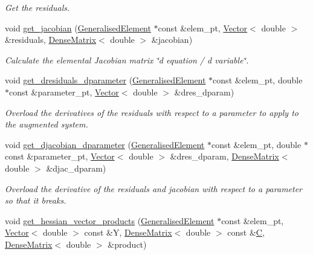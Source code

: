 \begin{DoxyCompactItemize}
\begin{DoxyCompactList}\small\item\em Get the residuals. \end{DoxyCompactList}\item 
void \hyperlink{classoomph_1_1HopfHandler_ab36c50421f53accced01dd9e04d904ef}{get\+\_\+jacobian} (\hyperlink{classoomph_1_1GeneralisedElement}{Generalised\+Element} $\ast$const \&elem\+\_\+pt, \hyperlink{classoomph_1_1Vector}{Vector}$<$ double $>$ \&residuals, \hyperlink{classoomph_1_1DenseMatrix}{Dense\+Matrix}$<$ double $>$ \&jacobian)
\begin{DoxyCompactList}\small\item\em Calculate the elemental Jacobian matrix \char`\"{}d equation 
/ d variable\char`\"{}. \end{DoxyCompactList}\item 
void \hyperlink{classoomph_1_1HopfHandler_a2953368ecc48dc22f8ea1f563064ece2}{get\+\_\+dresiduals\+\_\+dparameter} (\hyperlink{classoomph_1_1GeneralisedElement}{Generalised\+Element} $\ast$const \&elem\+\_\+pt, double $\ast$const \&parameter\+\_\+pt, \hyperlink{classoomph_1_1Vector}{Vector}$<$ double $>$ \&dres\+\_\+dparam)
\begin{DoxyCompactList}\small\item\em Overload the derivatives of the residuals with respect to a parameter to apply to the augmented system. \end{DoxyCompactList}\item 
void \hyperlink{classoomph_1_1HopfHandler_a59fb2c41d850cfe1fdccc3e97ca75135}{get\+\_\+djacobian\+\_\+dparameter} (\hyperlink{classoomph_1_1GeneralisedElement}{Generalised\+Element} $\ast$const \&elem\+\_\+pt, double $\ast$const \&parameter\+\_\+pt, \hyperlink{classoomph_1_1Vector}{Vector}$<$ double $>$ \&dres\+\_\+dparam, \hyperlink{classoomph_1_1DenseMatrix}{Dense\+Matrix}$<$ double $>$ \&djac\+\_\+dparam)
\begin{DoxyCompactList}\small\item\em Overload the derivative of the residuals and jacobian with respect to a parameter so that it breaks. \end{DoxyCompactList}\item 
void \hyperlink{classoomph_1_1HopfHandler_a74b0266ee15bcb294dbb946156095f8c}{get\+\_\+hessian\+\_\+vector\+\_\+products} (\hyperlink{classoomph_1_1GeneralisedElement}{Generalised\+Element} $\ast$const \&elem\+\_\+pt, \hyperlink{classoomph_1_1Vector}{Vector}$<$ double $>$ const \&Y, \hyperlink{classoomph_1_1DenseMatrix}{Dense\+Matrix}$<$ double $>$ const \&\hyperlink{classoomph_1_1HopfHandler_a99aabcf5ac54311f1f7acb0dbd431b84}{C}, \hyperlink{classoomph_1_1DenseMatrix}{Dense\+Matrix}$<$ double $>$ \&product)

\end{DoxyCompactItemize}
